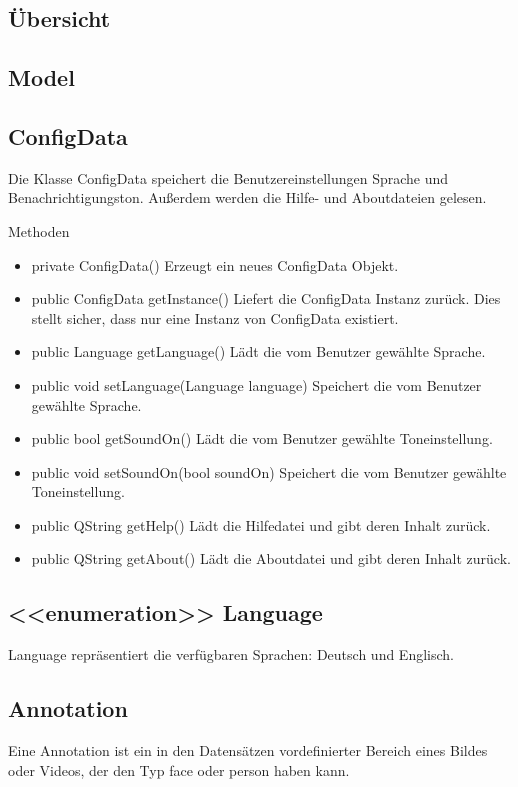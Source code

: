 \subsection{Übersicht}

\subsection{Model}

\subsection*{ConfigData}
Die Klasse ConfigData speichert die Benutzereinstellungen Sprache und Benachrichtigungston. Außerdem werden die Hilfe- und Aboutdateien gelesen.

Methoden
\begin{itemize}
\item private ConfigData() Erzeugt ein neues ConfigData Objekt.
\item public ConfigData getInstance() Liefert die ConfigData Instanz zurück. Dies stellt sicher, dass nur eine Instanz von ConfigData existiert.
\item public Language getLanguage() Lädt die vom Benutzer gewählte Sprache.
\item public void setLanguage(Language language) Speichert die vom Benutzer gewählte Sprache.
\item public bool getSoundOn() Lädt die vom Benutzer gewählte Toneinstellung.
\item public void setSoundOn(bool soundOn) Speichert die vom Benutzer gewählte Toneinstellung.
\item public QString getHelp() Lädt die Hilfedatei und gibt deren Inhalt zurück.
\item public QString getAbout() Lädt die Aboutdatei und gibt deren Inhalt zurück.
\end{itemize}

\subsection*{<<enumeration>> Language}
Language repräsentiert die verfügbaren Sprachen: Deutsch und Englisch.

\subsection*{Annotation}
Eine Annotation ist ein in den Datensätzen vordefinierter Bereich eines Bildes oder Videos, der den Typ face oder person haben kann.

